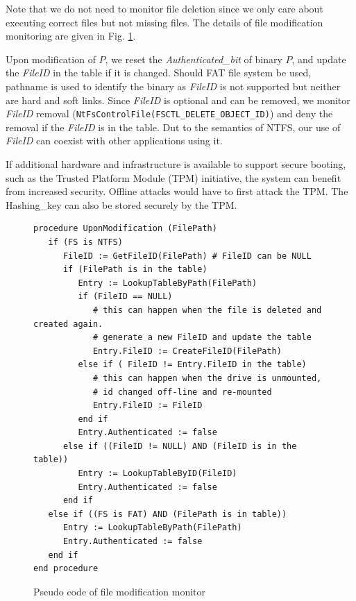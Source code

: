 \noindent
Note that we do not need to monitor file deletion since we only care about
executing correct files but not missing files.
The details of file modification monitoring are given in Fig. \ref{fileopen}.

Upon modification of $P$, we reset the {\it Authenticated\_bit} of binary $P$, 
and update the {\it FileID} in the table if it is changed.
Should FAT file system be used, pathname is used 
to identify the binary as {\it FileID} is not supported but
neither are hard and soft links.
Since {\it FileID} is optional and can be removed,
we monitor {\it FileID} removal ({\tt NtFsControlFile(FSCTL\_DELETE\_OBJECT\_ID)})
and deny the removal if the {\it FileID} is in the table.
Dut to the semantics of NTFS, our use of {\it FileID} can
coexist with other applications using it.

If additional hardware and infrastructure is available to support
secure booting, such as the Trusted Platform Module (TPM) initiative,
the system can benefit from increased security.
Offline attacks would have to first attack the TPM.
The Hashing\_key can also be stored securely by the TPM.


\begin{figure}[tb]
\scriptsize
\begin{center}
\begin{verbatim}
procedure UponModification (FilePath)
   if (FS is NTFS)
      FileID := GetFileID(FilePath) # FileID can be NULL
      if (FilePath is in the table)
         Entry := LookupTableByPath(FilePath)
         if (FileID == NULL)
            # this can happen when the file is deleted and created again.
            # generate a new FileID and update the table
            Entry.FileID := CreateFileID(FilePath)
         else if ( FileID != Entry.FileID in the table)
            # this can happen when the drive is unmounted,
            # id changed off-line and re-mounted
            Entry.FileID := FileID
         end if
         Entry.Authenticated := false
      else if ((FileID != NULL) AND (FileID is in the table))
         Entry := LookupTableByID(FileID)
         Entry.Authenticated := false
      end if
   else if ((FS is FAT) AND (FilePath is in table))
      Entry := LookupTableByPath(FilePath)
      Entry.Authenticated := false
   end if
end procedure
\end{verbatim}
\end{center}
\caption{Pseudo code of file modification monitor}
\label{fileopen}
\end{figure}
